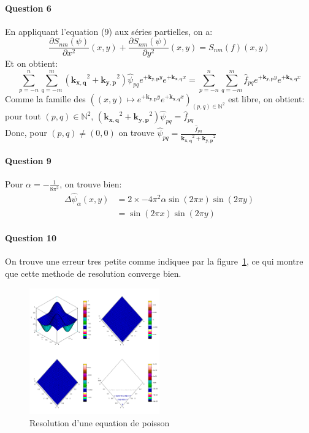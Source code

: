 \documentclass{article}
\newcommand{\pd}[2]{\dfrac{\partial#1}{\partial#2}}
\newcommand{\complex}[1]{\bm{#1}}
\newcommand{\kxq}{\complex{k_{x,q}}}
\newcommand{\kyp}{\complex{k_{y,p}}}
\begin{document}
\paragraph{Question 6}
En appliquant l'equation (9) aux séries partielles, on a:
\begin{equation}
	\pd{S_{nm}(\psi)}{x^2}(x,y)
    + 
	\pd{S_{nm}(\psi)}{y^2}(x,y)
	= S_{nm}(f)(x,y)
    \label{eq:poisson}
\end{equation}
Et on obtient:
\begin{equation*}
    \sum_{p=-n}^{n} \sum_{q=-m}^{m} (\kxq^2 + \kyp^2) \hat{\psi}_{pq} e^{+\kyp y} e^{+\kxq x}
	=
		\sum_{p=-n}^{n} \sum_{q=-m}^{m}\hat{f}_{pq} e^{+\kyp y} e^{+\kxq x}
\end{equation*}
Comme la famille des \(((x, y)\mapsto e^{+\kyp y} e^{+\kxq x})_{(p,q)\in\mathbb N^2}\)
est libre, on obtient: pour tout \((p,q)\in\mathbb N^2\), \((\kxq^2 + \kyp^2) \hat{\psi}_{pq} = \hat{f}_{pq}\)
\\
Donc, pour \((p,q)\neq(0,0)\) on trouve \(\hat{\psi}_{pq} = \frac{\hat{f}_{pq}}{\kxq^2 + \kyp^2}\)

\paragraph{Question 9}
Pour \(\alpha = -\frac{1}{8\pi^2}\), on trouve bien:
\begin{align*}
	\Delta \hat{\psi}_{\alpha}(x,y) & = 2\times-4\pi^2\alpha\sin(2\pi x)\sin(2\pi y)\\
	& = \sin(2\pi x)\sin(2\pi y)
\end{align*}

\paragraph{Question 10}
On trouve une erreur tres petite comme indiquee par la figure~\ref{fig:err_poiss}, ce qui montre que cette methode de resolution converge bien.

\begin{figure}
	\centering
	\includegraphics[width=0.5\textwidth]{poisson_error.png}
	\caption{Resolution d'une equation de poisson}\label{fig:err_poiss}
\end{figure}
\end{document}
